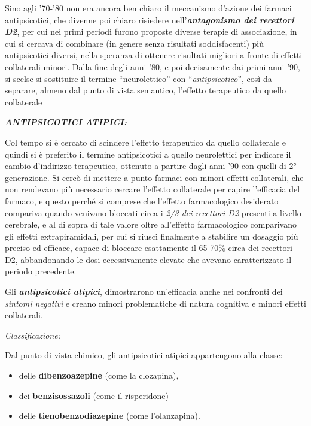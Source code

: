 \documentclass[]{article}
\begin{document}
Sino agli '70-'80 non era ancora ben chiaro il meccanismo d'azione dei
farmaci antipsicotici, che divenne poi chiaro risiedere
nell'\textbf{\emph{antagonismo dei recettori D2}}, per cui nei primi
periodi furono proposte diverse terapie di associazione, in cui si
cercava di combinare (in genere senza risultati soddisfacenti) più
antipsicotici diversi, nella speranza di ottenere risultati migliori a
fronte di effetti collaterali minori. Dalla fine degli anni '80, e poi
decisamente dai primi anni '90, si scelse si sostituire il termine
``neurolettico'' con ``\emph{antipsicotico}'', così da separare, almeno
dal punto di vista semantico, l'effetto terapeutico da quello
collaterale

\textbf{\emph{ANTIPSICOTICI ATIPICI:}}

Col tempo si è cercato di scindere l'effetto terapeutico da quello
collaterale e quindi si è preferito il termine antipsicotici a quello
neurolettici per indicare il cambio d'indirizzo terapeutico, ottenuto a
partire dagli anni '90 con quelli di 2° generazione. Si cercò di mettere
a punto farmaci con minori effetti collaterali, che non rendevano più
necessario cercare l'effetto collaterale per capire l'efficacia del
farmaco, e questo perché si comprese che l'effetto farmacologico
desiderato compariva quando venivano bloccati circa i \emph{2/3 dei
recettori D2} presenti a livello cerebrale, e al di sopra di tale valore
oltre all'effetto farmacologico comparivano gli effetti extrapiramidali,
per cui si riuscì finalmente a stabilire un dosaggio più preciso ed
efficace, capace di bloccare esattamente il 65-70\% circa dei recettori
D2, abbandonando le dosi eccessivamente elevate che avevano
caratterizzato il periodo precedente.

Gli \textbf{\emph{antipsicotici atipici}}, dimostrarono un'efficacia
anche nei confronti dei \emph{sintomi negativi} e creano minori
problematiche di natura cognitiva e minori effetti collaterali.

\emph{\emph{Classificazione: }}

Dal punto di vista chimico, gli antipsicotici atipici appartengono alla
classe:

\begin{itemize}
\item
  delle \textbf{dibenzoazepine} (come la clozapina),
\item
  dei \textbf{benzisossazoli} (come il risperidone)
\item
  delle \textbf{tienobenzodiazepine} (come l'olanzapina).
\end{itemize}
\end{document}
